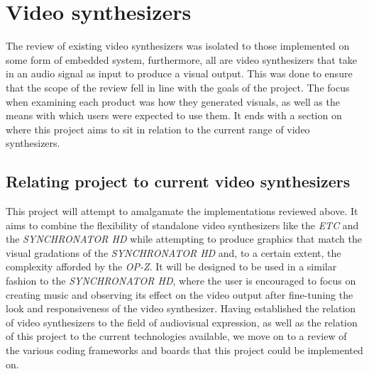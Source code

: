 \documentclass[../main_report1.tex]{subfiles}
\begin{document}
\section{Video synthesizers} \label{sec:vsynths}
The review of existing video synthesizers was isolated to those implemented on some form of embedded system, furthermore, all are video synthesizers that take in an audio signal as input to produce a visual output. This was done to ensure that the scope of the review fell in line with the goals of the project. The focus when examining each product was how they generated visuals, as well as the means with which users were expected to use them. It ends with a section on where this project aims to sit in relation to the current range of video synthesizers.





\subsection{Relating project to current video synthesizers}
This project will attempt to amalgamate the implementations reviewed above. It aims to combine the flexibility of standalone video synthesizers like the \textit{ETC} and the \textit{SYNCHRONATOR HD} while attempting to produce graphics that match the visual gradations of the \textit{SYNCHRONATOR HD} and, to a certain extent, the complexity afforded by the \textit{OP-Z}. It will be designed to be used in a similar fashion to the \textit{SYNCHRONATOR HD}, where the user is encouraged to focus on creating music and observing its effect on the video output after fine-tuning the look and responsiveness of the video synthesizer. Having established the relation of video synthesizers to the field of audiovisual expression, as well as the relation of this project to the current technologies available, we move on to a review of the various coding frameworks and boards that this project could be implemented on.
\end{document}
